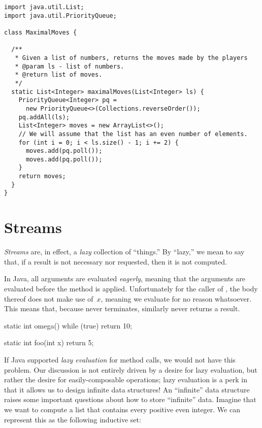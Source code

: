 \begin{lstlisting}[language=MyJava]
import java.util.List;
import java.util.PriorityQueue;

class MaximalMoves {

  /**
   * Given a list of numbers, returns the moves made by the players
   * @param ls - list of numbers.
   * @return list of moves.
   */
  static List<Integer> maximalMoves(List<Integer> ls) {
    PriorityQueue<Integer> pq = 
      new PriorityQueue<>(Collections.reverseOrder());
    pq.addAll(ls);
    List<Integer> moves = new ArrayList<>();
    // We will assume that the list has an even number of elements.
    for (int i = 0; i < ls.size() - 1; i += 2) {
      moves.add(pq.poll());
      moves.add(pq.poll());
    }
    return moves;
  }
}
\end{lstlisting}



\section{Streams}
\emph{Streams} are, in effect, a \emph{lazy} collection of ``things.'' 
By ``lazy,'' we mean to say that, if a result is not necessary nor requested, then it is not computed.

In Java, all arguments are evaluated \emph{eagerly}, meaning that the arguments are evaluated before the method is applied.
Unfortunately for the caller of , the body thereof does not make use of~$x$, meaning we evaluate  for no reason whatsoever. 
This means that, because  never terminates,  similarly never returns a result.

\begin{verbnobox}[\small]
static int omega() {
  while (true) {}
  return 10;
}
\end{verbnobox}
\begin{verbnobox}[\small]
static int foo(int x) {
  return 5;
}
\end{verbnobox}

If Java supported \emph{lazy evaluation} for method calls, we would not have this problem.
Our discussion is not entirely driven by a desire for lazy evaluation, but rather the desire for easily-composable operations; lazy evaluation is a perk in that it allows us to design infinite data structures! 
An ``infinite'' data structure raises some important questions about how to store ``infinite'' data. 
Imagine that we want to compute a list that contains every positive even integer. We can represent this as the following inductive set:


